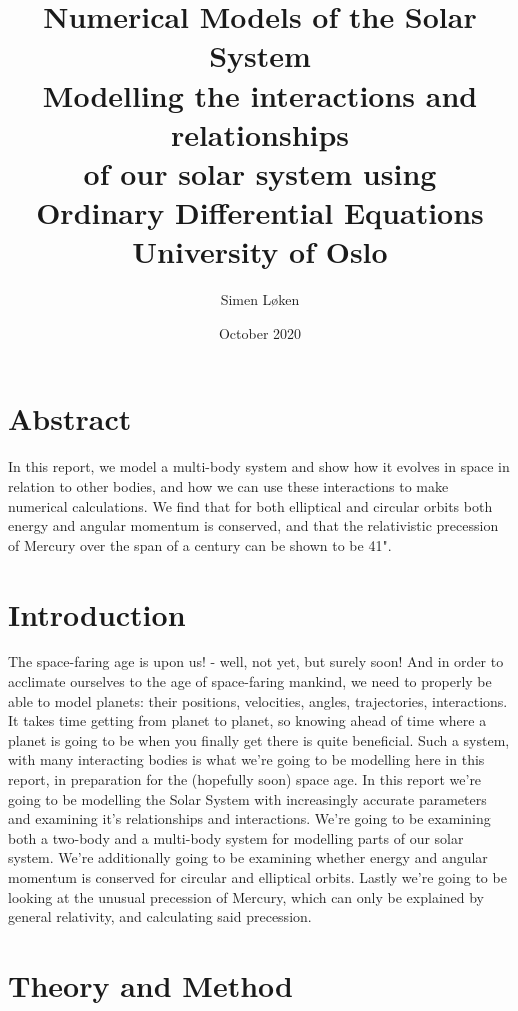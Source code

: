 \documentclass{article}
\title{%
\textbf{Numerical Models of the Solar System}\\
\Large Modelling the interactions and relationships \\ 
\Large of our solar system using \\
\Large Ordinary Differential Equations \\
\large University of Oslo}
\author{Simen Løken}
\date{October 2020}
\begin{document}
\nocite{projText}
\nocite{pythonPhys}
\maketitle
\section{Abstract}
In this report, we model a multi-body system and show how it evolves in space in relation to other bodies, and how we can use these interactions to make numerical calculations. We find that for both elliptical and circular orbits both energy and angular momentum is conserved, and that the relativistic precession of Mercury over the span of a century can be shown to be 41".
\section{Introduction}
The space-faring age is upon us! - well, not yet, but surely soon! And in order to acclimate ourselves to the age of space-faring mankind, we need to properly be able to model planets: their positions, velocities, angles, trajectories, interactions. It takes time getting from planet to planet, so knowing ahead of time where a planet is going to be when you finally get there is quite beneficial. Such a system, with many interacting bodies is what we're going to be modelling here in this report, in preparation for the (hopefully soon) space age.
\newline In this report we're going to be modelling the Solar System with increasingly accurate parameters and examining it's relationships and interactions. We're going to be examining both a two-body and a multi-body system for modelling parts of our solar system. We're additionally going to be examining whether energy and angular momentum is conserved for circular and elliptical orbits. Lastly we're going to be looking at the unusual precession of Mercury, which can only be explained by general relativity, and calculating said precession. \newpage
\section{Theory and Method}
\end{document}
